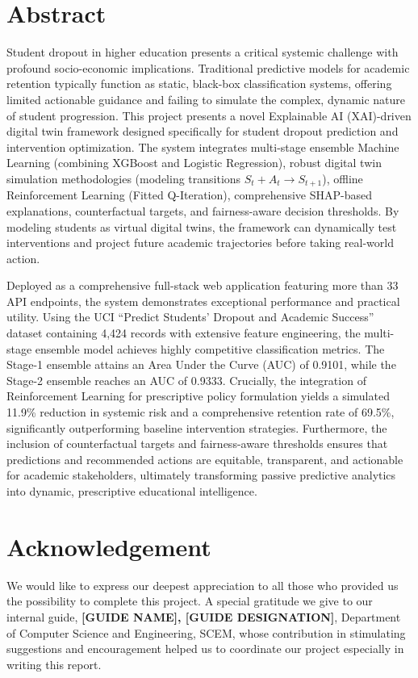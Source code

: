 \documentclass[12pt,a4paper]{report}
\begin{document}
\newpage
{}
\chapter*{Abstract}
Student dropout in higher education presents a critical systemic challenge with profound socio-economic implications. Traditional predictive models for academic retention typically function as static, black-box classification systems, offering limited actionable guidance and failing to simulate the complex, dynamic nature of student progression. This project presents a novel Explainable AI (XAI)-driven digital twin framework designed specifically for student dropout prediction and intervention optimization. The system integrates multi-stage ensemble Machine Learning (combining XGBoost and Logistic Regression), robust digital twin simulation methodologies (modeling transitions $S_t + A_t \rightarrow S_{t+1}$), offline Reinforcement Learning (Fitted Q-Iteration), comprehensive SHAP-based explanations, counterfactual targets, and fairness-aware decision thresholds. By modeling students as virtual digital twins, the framework can dynamically test interventions and project future academic trajectories before taking real-world action.

Deployed as a comprehensive full-stack web application featuring more than 33 API endpoints, the system demonstrates exceptional performance and practical utility. Using the UCI ``Predict Students' Dropout and Academic Success'' dataset containing 4,424 records with extensive feature engineering, the multi-stage ensemble model achieves highly competitive classification metrics. The Stage-1 ensemble attains an Area Under the Curve (AUC) of 0.9101, while the Stage-2 ensemble reaches an AUC of 0.9333. Crucially, the integration of Reinforcement Learning for prescriptive policy formulation yields a simulated 11.9\% reduction in systemic risk and a comprehensive retention rate of 69.5\%, significantly outperforming baseline intervention strategies. Furthermore, the inclusion of counterfactual targets and fairness-aware thresholds ensures that predictions and recommended actions are equitable, transparent, and actionable for academic stakeholders, ultimately transforming passive predictive analytics into dynamic, prescriptive educational intelligence.

\newpage
\chapter*{Acknowledgement}
We would like to express our deepest appreciation to all those who provided us the possibility to complete this project. A special gratitude we give to our internal guide, \textbf{[GUIDE NAME], [GUIDE DESIGNATION]}, Department of Computer Science and Engineering, SCEM, whose contribution in stimulating suggestions and encouragement helped us to coordinate our project especially in writing this report.
\end{document}
